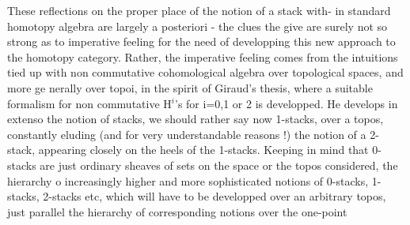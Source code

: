 These reflections on the proper place of the notion of a stack with-%
in standard homotopy algebra  are largely a posteriori  -  the clues the
give are surely not so strong as to   imperative feeling for the need
of developping this new approach to the homotopy category.  Rather,  the
imperative feeling comes from the  intuitions tied up with non
commutative  cohomological algebra over topological spaces,  and more ge%
\hand{-}nerally over topoi, in the spirit of Giraud's thesis,  where a suitable
formalism for non commutative H$^{i}$'s for  i=0,1 or 2 is developped.  He
develops in extenso the notion of stacks,  we should rather say now
1-stacks,  over a topos,  constantly eluding (and for very understandable
reasons !) the notion of a  2-stack,  appearing closely on the heels
of the 1-stacks.  Keeping in mind that 0-stacks are just ordinary
sheaves of sets\hand{,}  on the space or the topos considered,  the hierarchy o
increasingly higher and more sophisticated notions of 0-stacks, 1-stacks,
2-stacks etc,  which will have to be developped over an arbitrary topos,
just parallel the hierarchy of corresponding notions over the one-point
